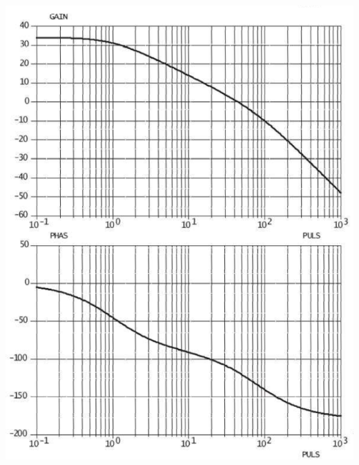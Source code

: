 \documentclass[10pt,fleqn]{article} %
\begin{document}
\begin{multicols}{2}
\begin{center}
\includegraphics[width=\linewidth]{images/img_04}
\end{center}


\end{multicols}
\end{document}
